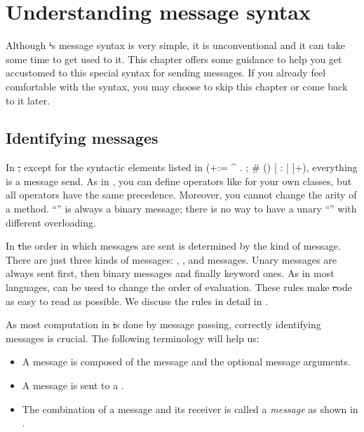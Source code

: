 \documentclass[a4paper,10pt,twoside]{book}
\begin{document}
	\renewcommand{\nnbb}[2]{} %
	\sloppy
\fi
\chapter{Understanding message syntax}
\label{cha:understanding}

Although \st's message syntax is very simple, it is unconventional and it can take some time to get used to it.
This chapter offers some guidance to help you get accustomed to this special syntax for sending messages.
If you already feel comfortable with the syntax, you may choose to skip this chapter or come back to it later.

\section{Identifying messages}

In \st, except for the syntactic elements listed in  (\ct+:= ^ . ; # () {} [ : | ]+), everything is a message send. 
As in , you can define operators like \ct{+} for your own classes, but all operators have the same precedence.
Moreover, you cannot change the arity of a method.
``\ct{-}'' is always a binary message; there is no way to have a unary ``\ct{-}'' with different overloading.

In \st the order in which messages are sent is determined by the kind of message.
There are just three kinds of messages: , , and  messages.
Unary messages are always sent first, then binary messages and finally keyword ones.
As in most languages,  can be used to change the order of evaluation.
These rules make \st code as easy to read as possible.
We discuss the rules in detail in .

As most computation in \st is done by message passing, correctly identifying messages is crucial.
The following terminology will help us:

\begin{itemize}
  \item A message is composed of the message  and the optional message arguments.
  \item A message is sent to a .
  \item The combination of a message and its receiver is called a \emph{message}  as shown in .
\end{itemize}
\end{document}
